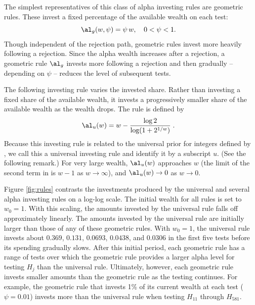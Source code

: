 \documentclass[12pt]{article}
\begin{document}
 The simplest representatives of this class of alpha investing rules are
 geometric rules.  These invest a fixed percentage of the available wealth on
 each test:
 \begin{equation}
    \al_g(w, \psi) = \psi \, w, \quad  0 < \psi < 1.
 \label{eq:Ageo}
 \end{equation}
 Though independent of the rejection path, geometric rules invest more heavily
 following a rejection.  Since the alpha wealth increases after a rejection, a
 geometric rule $\al_g$ invests more following a rejection and then gradually --
 depending on $\psi$ -- reduces the level of subsequent tests.


 The following investing rule varies the invested share.  Rather than investing
 a fixed share of the available wealth, it invests a progressively smaller share
 of the available wealth as the wealth drops.  The rule is defined by
 \begin{equation}
   \al_u(w) = w - \frac{\log 2}{\log(1+2^{1/w})} \;.   
 \label{eq:Auniv}
 \end{equation}
 Because this investing rule is related to the universal prior for integers
 defined by \citet{rissanen83}, we call this a universal investing rule and
 identify it by a subscript $u$.  (See the following remark.)  For very large
 wealth, $\al_u(w)$ approaches $w$ (the limit of the second term in
  is $w-1$ as $w \rightarrow \infty$), and $\al_u(w)
 \rightarrow 0$ as $w \rightarrow 0$.

 
 Figure \ref{fig:rules} contrasts the investments produced by the universal and
 several alpha investing rules on a log-log scale.  The initial wealth for all
 rules is set to $w_0 = 1$.  With this scaling, the amounts invested by the
 universal rule falls off approximately linearly.  The amounts invested by the
 universal rule are initially larger than those of any of these geometric rules.
  With $w_0=1$, the universal rule invests about $0.369$, $0.131$, $0.0693$,
 $0.0438$, and $0.0306$ in the first five tests before its spending gradually
 slows. After this initial period, each geometric rule has a range of tests over
 which the geometric rule provides a larger alpha level for testing $H_j$ than
 the universal rule.  Ultimately, however, each geometric rule invests smaller
 amounts than the geometric rule as the testing continues.  For example, the
 geometric rule that invests 1\% of its current wealth at each test
 ($\psi=0.01$) invests more than the universal rule when testing $H_{11}$
 through $H_{581}$. 
\end{document}
